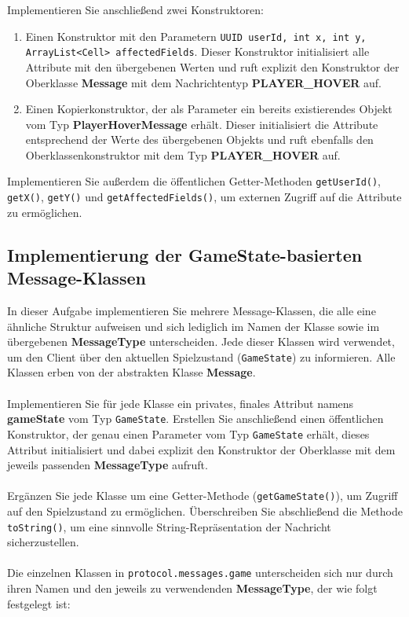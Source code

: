 \documentclass[12pt]{article}
\begin{document}
Implementieren Sie anschließend zwei Konstruktoren:
\begin{enumerate}
    \item Einen Konstruktor mit den Parametern \texttt{UUID userId, int x, int y, ArrayList<Cell> affectedFields}. Dieser Konstruktor initialisiert alle Attribute mit den übergebenen Werten und ruft explizit den Konstruktor der Oberklasse \textbf{Message} mit dem Nachrichtentyp \textbf{PLAYER\_HOVER} auf.
    \item Einen Kopierkonstruktor, der als Parameter ein bereits existierendes Objekt vom Typ \textbf{PlayerHoverMessage} erhält. Dieser initialisiert die Attribute entsprechend der Werte des übergebenen Objekts und ruft ebenfalls den Oberklassenkonstruktor mit dem Typ \textbf{PLAYER\_HOVER} auf.
\end{enumerate}

Implementieren Sie außerdem die öffentlichen Getter-Methoden \texttt{getUserId()}, \texttt{getX()}, \texttt{getY()} und \texttt{getAffectedFields()}, um externen Zugriff auf die Attribute zu ermöglichen.

\subsection*{Implementierung der GameState-basierten Message-Klassen}

In dieser Aufgabe implementieren Sie mehrere Message-Klassen, die alle eine ähnliche Struktur aufweisen und sich lediglich im Namen der Klasse sowie im übergebenen \textbf{MessageType} unterscheiden. Jede dieser Klassen wird verwendet, um den Client über den aktuellen Spielzustand (\texttt{GameState}) zu informieren. Alle Klassen erben von der abstrakten Klasse \textbf{Message}.
\\ \\
Implementieren Sie für jede Klasse ein privates, finales Attribut namens \textbf{gameState} vom Typ \texttt{GameState}. Erstellen Sie anschließend einen öffentlichen Konstruktor, der genau einen Parameter vom Typ \texttt{GameState} erhält, dieses Attribut initialisiert und dabei explizit den Konstruktor der Oberklasse mit dem jeweils passenden \textbf{MessageType} aufruft.
\\ \\
Ergänzen Sie jede Klasse um eine Getter-Methode (\texttt{getGameState()}), um Zugriff auf den Spielzustand zu ermöglichen. Überschreiben Sie abschließend die Methode \texttt{toString()}, um eine sinnvolle String-Repräsentation der Nachricht sicherzustellen.
\\ \\
Die einzelnen Klassen in \texttt{protocol.messages.game} unterscheiden sich nur durch ihren Namen und den jeweils zu verwendenden \textbf{MessageType}, der wie folgt festgelegt ist:
\end{document}
